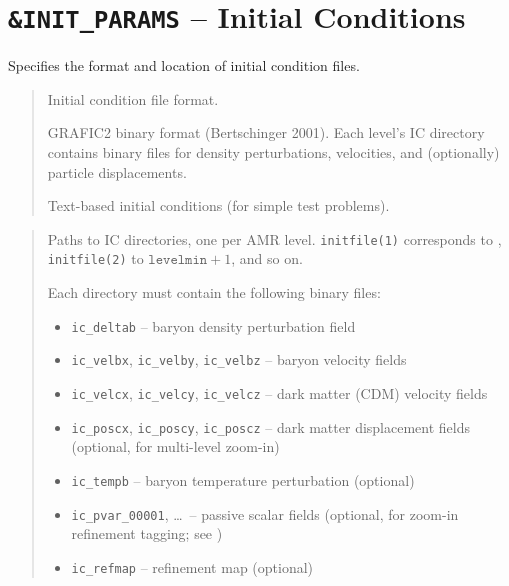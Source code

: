 \section{\texttt{\&INIT\_PARAMS} -- Initial Conditions}
\label{sec:init_params}

Specifies the format and location of initial condition files.

\label{param:filetype}

\begin{quote}
Initial condition file format.
\begin{description}[style=nextline,leftmargin=2.5cm,font=\ttfamily]
  \item[`grafic'] GRAFIC2 binary format (Bertschinger 2001).  Each
    level's IC directory contains binary files for density
    perturbations, velocities, and (optionally) particle
    displacements.
  \item[`ascii'] Text-based initial conditions (for simple test
    problems).
\end{description}
\end{quote}

\label{param:initfile}

\begin{quote}
Paths to IC directories, one per AMR level.
\texttt{initfile(1)} corresponds to ,
\texttt{initfile(2)} to $\texttt{levelmin}+1$, and so on.

Each directory must contain the following binary files:
\begin{itemize}[nosep]
  \item \texttt{ic\_deltab} -- baryon density perturbation field
  \item \texttt{ic\_velbx}, \texttt{ic\_velby}, \texttt{ic\_velbz}
        -- baryon velocity fields
  \item \texttt{ic\_velcx}, \texttt{ic\_velcy}, \texttt{ic\_velcz}
        -- dark matter (CDM) velocity fields
  \item \texttt{ic\_poscx}, \texttt{ic\_poscy}, \texttt{ic\_poscz}
        -- dark matter displacement fields (optional, for multi-level
        zoom-in)
  \item \texttt{ic\_tempb} -- baryon temperature perturbation
        (optional)
  \item \texttt{ic\_pvar\_00001}, \ldots\ -- passive scalar fields
        (optional, for zoom-in refinement tagging;
        see )
  \item \texttt{ic\_refmap} -- refinement map (optional)
\end{itemize}
\end{quote}


